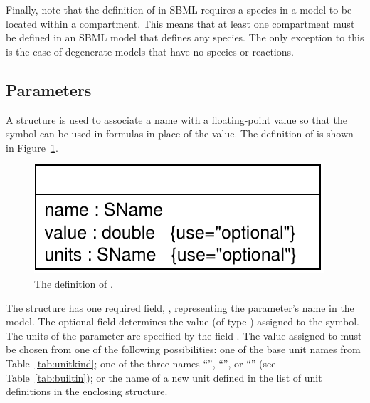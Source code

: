 \documentclass[10pt]{cekarticle}
\newcommand{\vref}[1]{\ref{#1}}
\newcommand{\changed}[1]{\textcolor{BrickRed}{#1}}
\newenvironment{blockChanged}{\color{BrickRed}}{}
\begin{document}
\begin{blockChanged}
  Finally, note that the definition of  in SBML requires a
  species in a model to be located within a compartment.  This means that
  at least one compartment must be defined in an SBML model that defines
  any species.  The only exception to this is the case of degenerate models
  that have no species or reactions.
\end{blockChanged}

\vspace*{1ex}                           %

\subsection{Parameters}
\label{sec:parameters}

A  structure is used to associate a \changed{name} with a
floating-point value so that the symbol can be used in formulas in place of
the value.  The definition of  is shown in
Figure~\vref{fig:parameter}.

\begin{figure}[htb]
  \centering
  \vspace*{8pt}
  \includegraphics[scale = 0.65]{parameter}
  \caption{The definition of .}
  \label{fig:parameter}
\end{figure}

\changed{The  structure has one required field,
  \attrib{name}, representing the parameter's name in the model.}  The
\changed{optional} field  determines the value (of type
) assigned to the symbol.  The units of the parameter
 are specified by the field .  The value
assigned to  must be chosen from one of the following
possibilities: one of \changed{the} base unit names from
Table~\vref{tab:unitkind}; one of the three names
``'', ``'', or ``''
(see Table~\ref{tab:builtin}); or the name of a new unit defined in the
list of unit definitions in the enclosing  structure.
\end{document}
